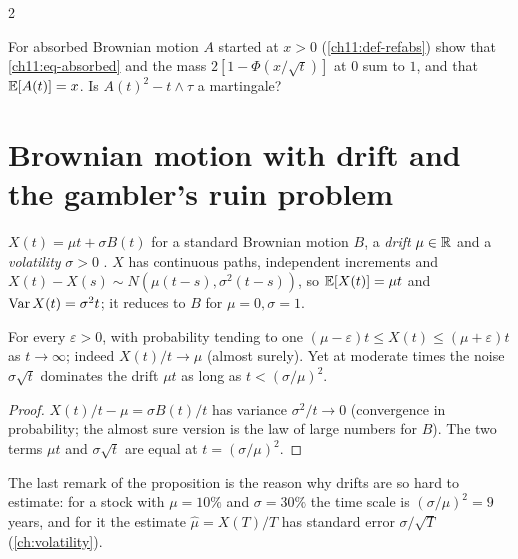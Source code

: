 \begin{paracol}{2}
\begin{exercise}\label{ch11:ex-abs}
For absorbed Brownian motion $A$ started at $x>0$ (\cref{ch11:def-refabs}) show that \eqref{ch11:eq-absorbed} and the mass $2[1-\Phi(x/\sqrt t)]$ at $0$ sum to $1$, and that $\mathbb{E}[A(t)]=x$.
Is $A(t)^2-t\wedge\tau$ a martingale?
\end{exercise}


\section{Brownian motion with drift and the gambler's ruin problem}\label{ch11:sec-drift}

\begin{definition}\label{ch11:def-drift}
$X(t)=\mu t+\sigma B(t)$ for a standard Brownian motion $B$, a \emph{drift} $\mu\in\mathbb{R}$ and a \emph{volatility} $\sigma>0$
. $X$ has continuous paths, independent increments and
$X(t)-X(s)\sim N(\mu(t-s),\sigma^2(t-s))$, so $\mathbb{E}[X(t)]=\mu t$ and $\operatorname{Var} X(t)=\sigma^2t$; it reduces to $B$ for $\mu=0,\sigma=1$.
\end{definition}

\begin{proposition}\label{ch11:prop-drift}
For every $\varepsilon>0$, with probability tending to one $(\mu-\varepsilon)t\le X(t)\le(\mu+\varepsilon)t$ as $t\to\infty$; indeed
$X(t)/t\to\mu$ (almost surely). Yet at moderate times the noise $\sigma\sqrt t$ dominates the drift $\mu t$ as long as $t<(\sigma/\mu)^2$.
\end{proposition}
\begin{proof}
$X(t)/t-\mu=\sigma B(t)/t$ has variance $\sigma^2/t\to0$ (convergence in probability; the almost sure version is the law of large numbers for $B$). The
two terms $\mu t$ and $\sigma\sqrt t$ are equal at $t=(\sigma/\mu)^2$.
\end{proof}
The last remark of the proposition is the reason why drifts are so hard to estimate: for a stock with $\mu=10\%$ and $\sigma=30\%$ the time
scale is $(\sigma/\mu)^2=9$ years, and for it the estimate $\hat\mu=X(T)/T$ has standard error $\sigma/\sqrt T$ (\cref{ch:volatility}).


\end{paracol}
